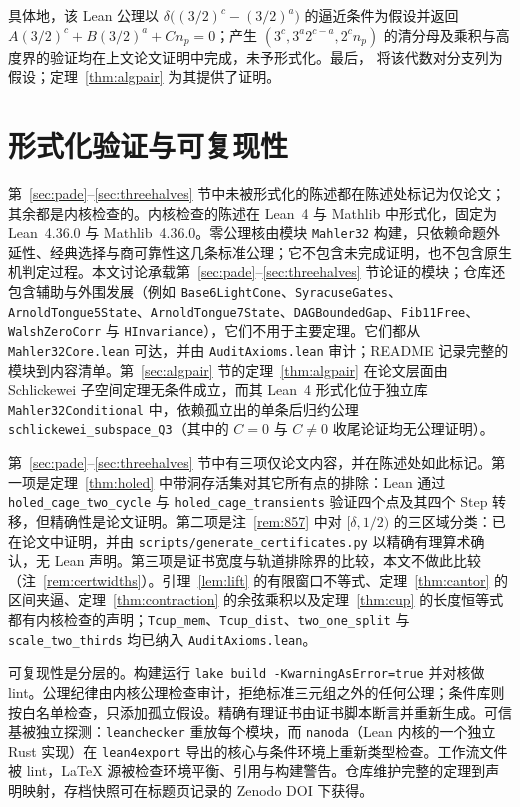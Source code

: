 \documentclass[11pt,a4paper]{article}
\theoremstyle{remark}
\begin{document}
具体地，该 Lean 公理以 $\delta\bigl((3/2)^{c}-(3/2)^{a}\bigr)$ 的逼近条件为假设并返回 $A(3/2)^{c} + B(3/2)^{a} + C n_{p} = 0$；产生 $(3^{c}, 3^{a}2^{c-a}, 2^{c}n_{p})$ 的清分母及乘积与高度界的验证均在上文论文证明中完成，未予形式化。最后，\citet[定理~5.15]{stephan2026minimal} 将该代数对分支列为假设；定理~\ref{thm:algpair} 为其提供了证明。

\section{形式化验证与可复现性}
\label{sec:formal}

第~\ref{sec:pade}--\ref{sec:threehalves} 节中未被形式化的陈述都在陈述处标记为仅论文；其余都是内核检查的。内核检查的陈述在 Lean~4 与 Mathlib 中形式化，固定为 Lean~4.36.0 与 Mathlib~4.36.0。零公理核由模块 \texttt{Mahler32} 构建，只依赖命题外延性、经典选择与商可靠性这几条标准公理；它不包含未完成证明，也不包含原生机判定过程。本文讨论承载第~\ref{sec:pade}--\ref{sec:threehalves} 节论证的模块；仓库还包含辅助与外围发展（例如 \texttt{Base6LightCone}、\texttt{SyracuseGates}、\texttt{ArnoldTongue5State}、\texttt{ArnoldTongue7State}、\texttt{DAGBoundedGap}、\texttt{Fib11Free}、\texttt{WalshZeroCorr} 与 \texttt{HInvariance}），它们不用于主要定理。它们都从 \texttt{Mahler32Core.lean} 可达，并由 \texttt{AuditAxioms.lean} 审计；README 记录完整的模块到内容清单。第~\ref{sec:algpair} 节的定理~\ref{thm:algpair} 在论文层面由 Schlickewei 子空间定理无条件成立，而其 Lean~4 形式化位于独立库 \texttt{Mahler32Conditional} 中，依赖孤立出的单条后归约公理 \texttt{schlickewei\_subspace\_Q3}（其中的 $C = 0$ 与 $C \ne 0$ 收尾论证均无公理证明）。

第~\ref{sec:pade}--\ref{sec:threehalves} 节中有三项仅论文内容，并在陈述处如此标记。第一项是定理~\ref{thm:holed} 中带洞存活集对其它所有点的排除：Lean 通过 \texttt{holed\_cage\_two\_cycle} 与 \texttt{holed\_cage\_transients} 验证四个点及其四个 $\mathrm{Step}$ 转移，但精确性是论文证明。第二项是注~\ref{rem:857} 中对 $[\delta,1/2)$ 的三区域分类：已在论文中证明，并由 \texttt{scripts/generate\_certificates.py} 以精确有理算术确认，无 Lean 声明。第三项是证书宽度与轨道排除界的比较，本文不做此比较（注~\ref{rem:certwidths}）。引理~\ref{lem:lift} 的有限窗口不等式、定理~\ref{thm:cantor} 的区间夹逼、定理~\ref{thm:contraction} 的余弦乘积以及定理~\ref{thm:cup} 的长度恒等式都有内核检查的声明；\texttt{Tcup\_mem}、\texttt{Tcup\_dist}、\texttt{two\_one\_split} 与 \texttt{scale\_two\_thirds} 均已纳入 \texttt{AuditAxioms.lean}。

可复现性是分层的。构建运行 \texttt{lake build -KwarningAsError=true} 并对核做 lint。公理纪律由内核公理检查审计，拒绝标准三元组之外的任何公理；条件库则按白名单检查，只添加孤立假设。精确有理证书由证书脚本断言并重新生成。可信基被独立探测：\texttt{leanchecker} 重放每个模块，而 \texttt{nanoda}（Lean 内核的一个独立 Rust 实现）在 \texttt{lean4export} 导出的核心与条件环境上重新类型检查。工作流文件被 lint，LaTeX 源被检查环境平衡、引用与构建警告。仓库维护完整的定理到声明映射，存档快照可在标题页记录的 Zenodo DOI 下获得。
\end{document}
